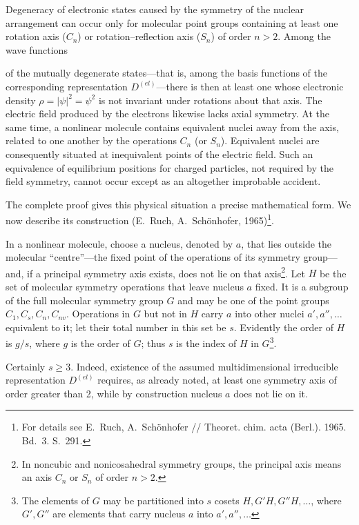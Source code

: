 Degeneracy of electronic states caused by the symmetry of the nuclear arrangement can occur only for molecular point groups containing at least one rotation axis ($C_n$) or rotation--reflection axis ($S_n$) of order $n>2$. Among the wave functions

of the mutually degenerate states---that is, among the basis functions of the corresponding representation $D^{(el)}$---there is then at least one whose electronic density $\rho=|\psi|^2=\psi^2$ is not invariant under rotations about that axis. The electric field produced by the electrons likewise lacks axial symmetry. At the same time, a nonlinear molecule contains equivalent nuclei away from the axis, related to one another by the operations $C_n$ (or $S_n$). Equivalent nuclei are consequently situated at inequivalent points of the electric field. Such an equivalence of equilibrium positions for charged particles, not required by the field symmetry, cannot occur except as an altogether improbable accident.

The complete proof gives this physical situation a precise mathematical form. We now describe its construction (E.~Ruch, A.~Schönhofer, 1965)\footnote{For details see E.~Ruch, A.~Schönhofer // Theoret. chim. acta (Berl.). 1965. Bd.~3. S.~291.}.

In a nonlinear molecule, choose a nucleus, denoted by $a$, that lies outside the molecular ``centre''---the fixed point of the operations of its symmetry group---and, if a principal symmetry axis exists, does not lie on that axis\footnote{In noncubic and nonicosahedral symmetry groups, the principal axis means an axis $C_n$ or $S_n$ of order $n>2$.}. Let $H$ be the set of molecular symmetry operations that leave nucleus $a$ fixed. It is a subgroup of the full molecular symmetry group $G$ and may be one of the point groups $C_1,C_s,C_n,C_{nv}$. Operations in $G$ but not in $H$ carry $a$ into other nuclei $a',a'',\ldots$ equivalent to it; let their total number in this set be $s$. Evidently the order of $H$ is $g/s$, where $g$ is the order of $G$; thus $s$ is the index of $H$ in $G$\footnote{The elements of $G$ may be partitioned into $s$ cosets $H,G'H,G''H,\ldots$, where $G',G''$ are elements that carry nucleus $a$ into $a',a'',\ldots$}.

Certainly $s\geqslant3$. Indeed, existence of the assumed multidimensional irreducible representation $D^{(el)}$ requires, as already noted, at least one symmetry axis of order greater than 2, while by construction nucleus $a$ does not lie on it.

